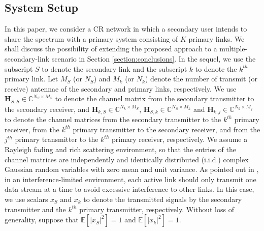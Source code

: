 \documentclass[twocolumn,10pt]{IEEEtran}
\theoremstyle{plain} \newtheorem{theorem}{Theorem}
\theoremstyle{plain} \newtheorem{proposition}{Proposition}
\theoremstyle{plain} \newtheorem{corollary}{Corollary}
\theoremstyle{remark} \newtheorem{remark}{Remark}
\theoremstyle{remark} \newtheorem{lemma}{Lemma}
\theoremstyle{plain} \newtheorem{definition}{Definition}
\theoremstyle{plain} \newtheorem{assumption}{Assumption}
\theoremstyle{plain} \newtheorem{fact}{Fact}
\begin{document}
\subsection{System Setup}
In this paper, we consider a CR network in which a secondary user intends to share the spectrum with a primary system consisting of $K$ primary links.  We shall discuss the possibility of extending the proposed approach to a multiple-secondary-link scenario in Section \ref{section:conclusions}. In the sequel, we use the subscript $S$ to denote the secondary link and the subscript $k$ to denote the $k^{th}$ primary link. Let $M_S$ (or $N_S$) and $M_k$ (or $N_k$) denote the number of transmit (or receive) antennae of the secondary and primary links, respectively.  We use $\mathbf{H}_{S,S} \in \mathbb{C}^{N_S\times M_S}$ to denote the channel matrix from the secondary transmitter to the secondary receiver, and $\mathbf{H}_{k,S} \in \mathbb{C}^{N_k\times M_S}$, $\mathbf{H}_{S,k} \in \mathbb{C}^{N_S\times M_k}$ and $\mathbf{H}_{k,j} \in \mathbb{C}^{N_k\times M_j}$ to denote the channel matrices from the secondary transmitter to the $k^{th}$ primary receiver, from the $k^{th}$ primary transmitter to the secondary receiver, and from the $j^{th}$ primary transmitter to the $k^{th}$ primary receiver, respectively. We assume a Rayleigh fading and rich scattering environment, so that the entries of the channel matrices are independently and identically distributed (i.i.d.) complex Gaussian random variables with zero mean and unit variance. As pointed out in \cite{B03, MZSY08}, in an interference-limited environment, each active link should only transmit one data stream at a time to avoid excessive interference to other links. In this case, we use scalars $x_S$ and $x_k$ to denote the transmitted signals by the secondary transmitter and the $k^{th}$ primary transmitter, respectively. Without loss of generality, suppose that $\mathbb{E}[|x_S|^2]=1$ and $\mathbb{E}[|x_k|^2]=1$.
\end{document}
